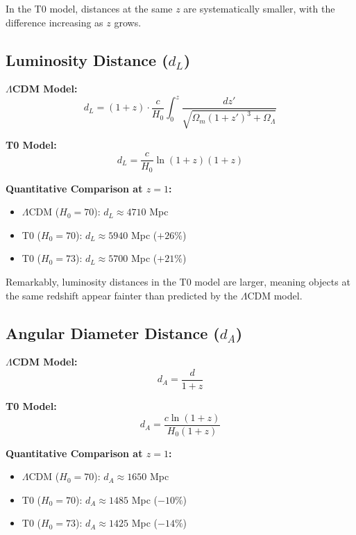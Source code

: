 \documentclass[a4paper,12pt]{article}
\theoremstyle{definition}
\theoremstyle{remark}
\begin{document}
	In the T0 model, distances at the same $z$ are systematically smaller, with the difference increasing as $z$ grows.
	
	\subsection{Luminosity Distance ($d_L$)}
	
	\textbf{$\Lambda$CDM Model:}
	\begin{equation}
		d_L = (1 + z) \cdot \frac{c}{H_0} \int_0^z \frac{dz'}{\sqrt{\Omega_m (1 + z')^3 + \Omega_\Lambda}}
	\end{equation}
	
	\textbf{T0 Model:}
	\begin{equation}
		d_L = \frac{c}{H_0} \ln(1 + z) (1 + z)
	\end{equation}
	
	\textbf{Quantitative Comparison at $z = 1$:}
	\begin{itemize}
		\item $\Lambda$CDM ($H_0 = 70$): $d_L \approx 4710$ Mpc
		\item T0 ($H_0 = 70$): $d_L \approx 5940$ Mpc ($+26\%$)
		\item T0 ($H_0 = 73$): $d_L \approx 5700$ Mpc ($+21\%$)
	\end{itemize}
	
	Remarkably, luminosity distances in the T0 model are larger, meaning objects at the same redshift appear fainter than predicted by the $\Lambda$CDM model.
	
	\subsection{Angular Diameter Distance ($d_A$)}
	
	\textbf{$\Lambda$CDM Model:}
	\begin{equation}
		d_A = \frac{d}{1 + z}
	\end{equation}
	
	\textbf{T0 Model:}
	\begin{equation}
		d_A = \frac{c \ln(1 + z)}{H_0 (1 + z)}
	\end{equation}
	
	\textbf{Quantitative Comparison at $z = 1$:}
	\begin{itemize}
		\item $\Lambda$CDM ($H_0 = 70$): $d_A \approx 1650$ Mpc
		\item T0 ($H_0 = 70$): $d_A \approx 1485$ Mpc ($-10\%$)
		\item T0 ($H_0 = 73$): $d_A \approx 1425$ Mpc ($-14\%$)
	\end{itemize}
	
\end{document}
